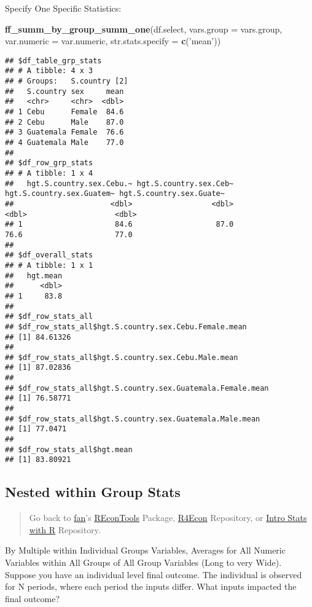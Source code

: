 \documentclass[
]{book}
\newenvironment{Shaded}{\begin{snugshade}}{\end{snugshade}}
\newcommand{\DataTypeTok}[1]{\textcolor[rgb]{0.13,0.29,0.53}{#1}}
\newcommand{\KeywordTok}[1]{\textcolor[rgb]{0.13,0.29,0.53}{\textbf{#1}}}
\newcommand{\NormalTok}[1]{#1}
\newcommand{\StringTok}[1]{\textcolor[rgb]{0.31,0.60,0.02}{#1}}
\begin{document}
Specify One Specific Statistics:

\begin{Shaded}
\begin{Highlighting}[]
\KeywordTok{ff_summ_by_group_summ_one}\NormalTok{(df.select, }\DataTypeTok{vars.group =}\NormalTok{ vars.group, }\DataTypeTok{var.numeric =}\NormalTok{ var.numeric, }\DataTypeTok{str.stats.specify =} \KeywordTok{c}\NormalTok{(}\StringTok{'mean'}\NormalTok{))}
\end{Highlighting}
\end{Shaded}

\begin{verbatim}
## $df_table_grp_stats
## # A tibble: 4 x 3
## # Groups:   S.country [2]
##   S.country sex     mean
##   <chr>     <chr>  <dbl>
## 1 Cebu      Female  84.6
## 2 Cebu      Male    87.0
## 3 Guatemala Female  76.6
## 4 Guatemala Male    77.0
## 
## $df_row_grp_stats
## # A tibble: 1 x 4
##   hgt.S.country.sex.Cebu.~ hgt.S.country.sex.Ceb~ hgt.S.country.sex.Guatem~ hgt.S.country.sex.Guate~
##                      <dbl>                  <dbl>                     <dbl>                    <dbl>
## 1                     84.6                   87.0                      76.6                     77.0
## 
## $df_overall_stats
## # A tibble: 1 x 1
##   hgt.mean
##      <dbl>
## 1     83.8
## 
## $df_row_stats_all
## $df_row_stats_all$hgt.S.country.sex.Cebu.Female.mean
## [1] 84.61326
## 
## $df_row_stats_all$hgt.S.country.sex.Cebu.Male.mean
## [1] 87.02836
## 
## $df_row_stats_all$hgt.S.country.sex.Guatemala.Female.mean
## [1] 76.58771
## 
## $df_row_stats_all$hgt.S.country.sex.Guatemala.Male.mean
## [1] 77.0471
## 
## $df_row_stats_all$hgt.mean
## [1] 83.80921
\end{verbatim}

\hypertarget{nested-within-group-stats}{%
\subsection{Nested within Group Stats}\label{nested-within-group-stats}}

\begin{quote}
Go back to \href{http://fanwangecon.github.io/CodeDynaAsset/}{fan}'s \href{https://fanwangecon.github.io/REconTools/}{REconTools} Package, \href{https://fanwangecon.github.io/R4Econ/}{R4Econ} Repository, or \href{https://fanwangecon.github.io/Stat4Econ/}{Intro Stats with R} Repository.
\end{quote}

By Multiple within Individual Groups Variables, Averages for All Numeric Variables within All Groups of All Group Variables (Long to very Wide). Suppose you have an individual level final outcome. The individual is observed for N periods, where each period the inputs differ. What inputs impacted the final outcome?
\end{document}
